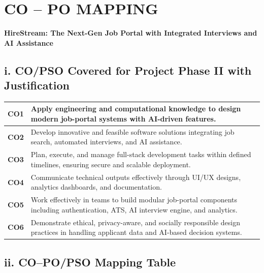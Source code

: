 \documentclass[a4paper, 12pt]{report}
\begin{document}
\chapter*{CO -- PO MAPPING}

\begin{center}
    {\Large \textbf{HireStream: The Next-Gen Job Portal with Integrated Interviews and AI Assistance}}
\end{center}

\vspace{0.6cm}

\section*{i. CO/PSO Covered for Project Phase II with Justification}

\renewcommand{\arraystretch}{1.3}
\begin{tabular}{|c|p{12cm}|}
\hline
\textbf{CO1} & Apply engineering and computational knowledge to design modern job-portal systems with AI-driven features. \\ \hline
\textbf{CO2} & Develop innovative and feasible software solutions integrating job search, automated interviews, and AI assistance. \\ \hline
\textbf{CO3} & Plan, execute, and manage full-stack development tasks within defined timelines, ensuring secure and scalable deployment. \\ \hline
\textbf{CO4} & Communicate technical outputs effectively through UI/UX designs, analytics dashboards, and documentation. \\ \hline
\textbf{CO5} & Work effectively in teams to build modular job-portal components including authentication, ATS, AI interview engine, and analytics. \\ \hline
\textbf{CO6} & Demonstrate ethical, privacy-aware, and socially responsible design practices in handling applicant data and AI-based decision systems. \\ \hline
\end{tabular}


\vspace{1cm}

\section*{ii. CO--PO/PSO Mapping Table}
\end{document}
